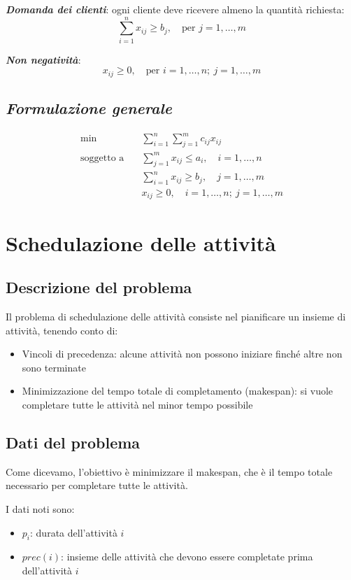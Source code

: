\textbf{\textit{Domanda dei clienti}}: ogni cliente deve ricevere almeno la quantità richiesta:
\[
\sum_{i=1}^{n} x_{ij} \geq b_j, \quad \text{per } j = 1, \dots, m
\]

\textbf{\textit{Non negatività}}:
\[
x_{ij} \geq 0, \quad \text{per } i = 1, \dots, n;\ j = 1, \dots, m
\]

\subsection{\textbf{\textit{Formulazione generale}}}
\[
\begin{aligned}
\min \quad & \sum_{i=1}^{n} \sum_{j=1}^{m} c_{ij} x_{ij} \\
\text{soggetto a} \quad 
& \sum_{j=1}^{m} x_{ij} \leq a_i, \quad i = 1, \dots, n \\
& \sum_{i=1}^{n} x_{ij} \geq b_j, \quad j = 1, \dots, m \\
& x_{ij} \geq 0, \quad i = 1, \dots, n;\ j = 1, \dots, m
\end{aligned}
\]

\section{Schedulazione delle attività}
\subsection{Descrizione del problema}

Il problema di schedulazione delle attività consiste nel pianificare un insieme di attività,
tenendo conto di:
\begin{itemize}
    \item Vincoli di precedenza: alcune attività non possono iniziare finché altre non sono terminate
    \item Minimizzazione del tempo totale di completamento (makespan): si vuole completare tutte le attività nel minor tempo possibile
\end{itemize}

\subsection{Dati del problema}
Come dicevamo, l'obiettivo è minimizzare il makespan, che è il tempo totale necessario per completare tutte le attività.

I dati noti sono:
\begin{itemize}
    \item $p_i$: durata dell'attività $i$
    \item $prec(i)$: insieme delle attività che devono essere completate prima dell'attività $i$
\end{itemize}

